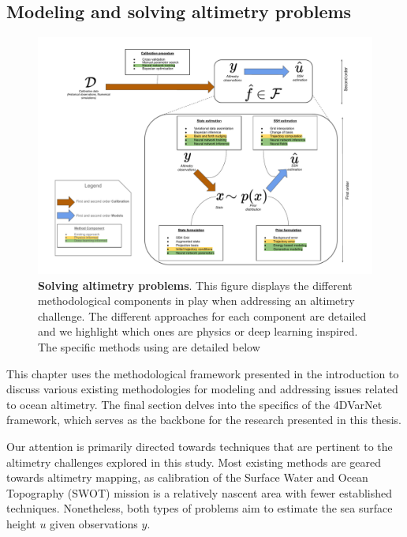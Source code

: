 \begin{bibunit}

  \chapter*{Modeling and solving altimetry problems}
  
\begin{figure}[h]
    \centering
    \includegraphics[width=\textwidth]{00_LitReview/Methodology.pdf}
    \caption{\textbf{Solving altimetry problems}. This figure displays the different methodological components in play when addressing an altimetry challenge. The different approaches for each component are detailed and we highlight which ones are physics or deep learning inspired. The specific methods using are detailed below}
    \label{fig:method}
\end{figure}

This chapter uses the methodological framework presented in the introduction to discuss various existing methodologies for modeling and addressing issues related to ocean altimetry. The final section delves into the specifics of the 4DVarNet framework, which serves as the backbone for the research presented in this thesis.



Our attention is primarily directed towards techniques that are pertinent to the altimetry challenges explored in this study. Most existing methods are geared towards altimetry mapping, as calibration of the Surface Water and Ocean Topography (SWOT) mission is a relatively nascent area with fewer established techniques. Nonetheless, both types of problems aim to estimate the sea surface height $u$ given observations $y$.




\end{bibunit}
